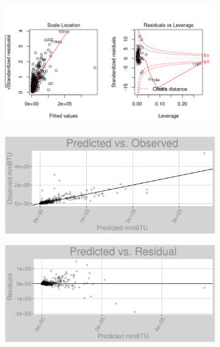 \begin{figure}[h]
\begin{subfigure}{1\textwidth}
\includegraphics[width=.99\textwidth, height=0.3\textheight]{Images/electricity_nn_full_resid_2.png}
\end{subfigure}
\begin{subfigure}{1\textwidth}
\centering
\includegraphics[width=.99\textwidth, height=0.3\textheight]{Images/electricity_nn_full_pvo.png}
\end{subfigure}
\begin{subfigure}{1\textwidth}
\centering
\includegraphics[width=.99\textwidth, height=0.3\textheight]{Images/electricity_nn_full_pvr.png}
\end{subfigure}
\end{figure}
